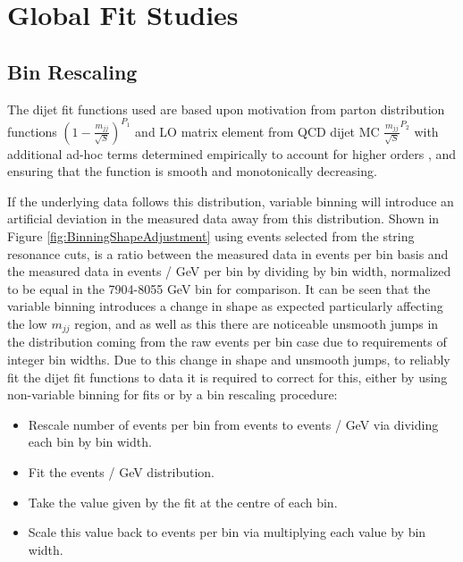 \section{Global Fit Studies}
\subsection{Bin Rescaling}
\label{subsec:binRescaling:GlobalFitting} %
The dijet fit functions used are based upon motivation from parton distribution functions $\left(1-\frac{m_{jj}}{\sqrt{S}}\right)^{P_{1}}$ and LO matrix element from QCD dijet MC $\frac{m_{jj}}{\sqrt{S}}^{P_{2}}$ with additional ad-hoc terms determined empirically to account for higher orders \cite{ATL-COM-PHYS-2018-161}, and ensuring that the function is smooth and monotonically decreasing. 

If the underlying data follows this distribution, variable binning will introduce an artificial deviation in the measured data away from this distribution. Shown in Figure \ref{fig:BinningShapeAdjustment} using events selected from the string resonance cuts, is a ratio between the measured data in events per bin basis and the measured data in events / GeV per bin by dividing by bin width, normalized to be equal in the 7904-8055 GeV bin for comparison. It can be seen that the variable binning introduces a change in shape as expected particularly affecting the low $m_{jj}$ region, and as well as this there are noticeable unsmooth jumps in the distribution coming from the raw events per bin case due to requirements of integer bin widths. Due to this change in shape and unsmooth jumps, to reliably fit the dijet fit functions to data it is required to correct for this, either by using non-variable binning for fits or by a bin rescaling procedure:

\begin{itemize}
    \item Rescale number of events per bin from events to events / GeV via dividing each bin by bin width.
    \item Fit the events / GeV distribution.
    \item Take the value given by the fit at the centre of each bin.
    \item Scale this value back to events per bin via multiplying each value by bin width.
\end{itemize}

